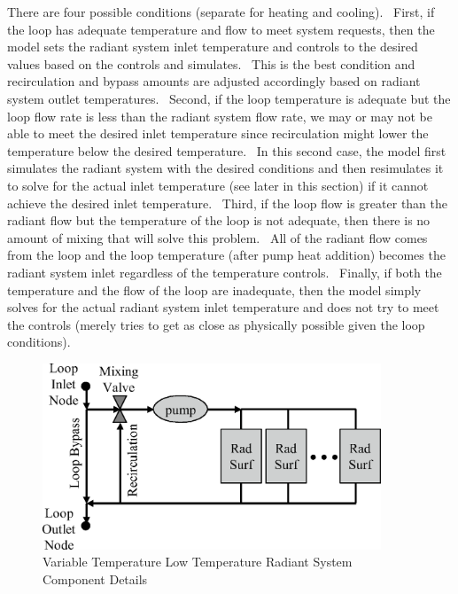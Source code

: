 There are four possible conditions (separate for heating and cooling).~ First, if the loop has adequate temperature and flow to meet system requests, then the model sets the radiant system inlet temperature and controls to the desired values based on the controls and simulates.~ This is the best condition and recirculation and bypass amounts are adjusted accordingly based on radiant system outlet temperatures.~ Second, if the loop temperature is adequate but the loop flow rate is less than the radiant system flow rate, we may or may not be able to meet the desired inlet temperature since recirculation might lower the temperature below the desired temperature.~ In this second case, the model first simulates the radiant system with the desired conditions and then resimulates it to solve for the actual inlet temperature (see later in this section) if it cannot achieve the desired inlet temperature.~ Third, if the loop flow is greater than the radiant flow but the temperature of the loop is not adequate, then there is no amount of mixing that will solve this problem.~ All of the radiant flow comes from the loop and the loop temperature (after pump heat addition) becomes the radiant system inlet regardless of the temperature controls.~ Finally, if both the temperature and the flow of the loop are inadequate, then the model simply solves for the actual radiant system inlet temperature and does not try to meet the controls (merely tries to get as close as physically possible given the loop conditions).

\begin{figure}[hbtp] %
\centering
\includegraphics[width=0.9\textwidth, height=0.9\textheight, keepaspectratio=true]{media/image6055.png}
\caption{Variable Temperature Low Temperature Radiant System Component Details \protect \label{fig:variable-temperature-low-temperature-radiant-001}}
\end{figure}

